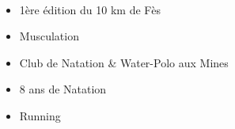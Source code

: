 \documentclass[10pt,a4paper,ragged2e,withhyper]{altacv}
\begin{document}
\begin{paracol}{2}
\\
\smallskip
\begin{itemize}
    \item 1ère édition du 10 km de Fès 
    \item Musculation
    \item Club de Natation \& Water-Polo aux Mines
    \item 8 ans de Natation
    \item Running
\end{itemize}
\smallskip
{}\\
\smallskip
{}\\ 

\divider
\medskip












\medskip








\end{paracol}
\end{document}
